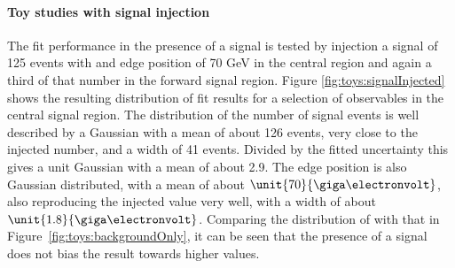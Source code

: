 \paragraph{Toy studies with signal injection}
The fit performance in the presence of a signal is tested by injection a signal of 125 events with and edge position of 70 GeV in the central region and again a third of that number in the forward signal region. Figure \ref{fig:toys:signalInjected} shows the resulting distribution of fit results for a selection of observables in the central signal region. The distribution of the number of signal events is well described by a Gaussian with a mean of about 126 events, very close to the injected number, and a width of 41 events. Divided by the fitted uncertainty this gives a unit Gaussian with a mean of about 2.9. The edge position is also Gaussian distributed, with a mean of about $\unit{70}{\giga\electronvolt}$, also reproducing the injected value very well, with a width of about $\unit{1.8}{\giga\electronvolt}$. Comparing the distribution of \Rsfof with that in Figure~\ref{fig:toys:backgroundOnly}, it can be seen that the presence of a signal does not bias the result towards higher values. 
